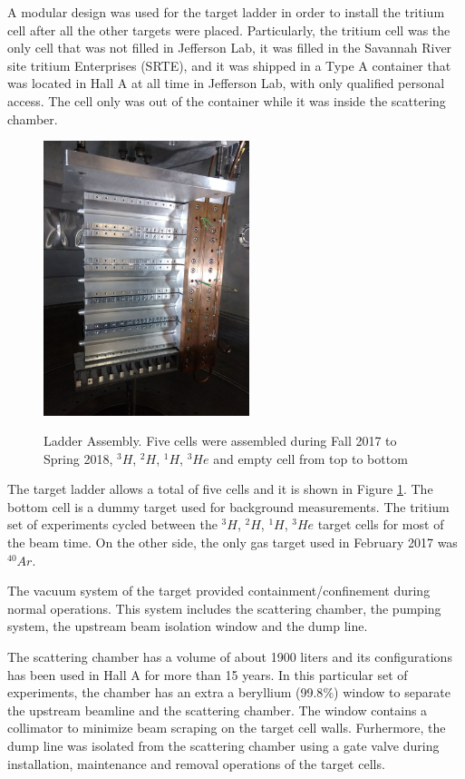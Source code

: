 \documentclass[final,5p,times,twocolumn]{elsarticle}
\begin{document}
A modular design was used for the target ladder in order to install the tritium cell after all the other targets were placed. 
Particularly, the tritium cell was the only cell that was not filled in Jefferson Lab, it was filled in the Savannah River 
site tritium Enterprises (SRTE), and it was shipped in a Type A container that was located in Hall A at all time in Jefferson Lab, 
with only qualified personal access. The cell only was out of the container while it was inside the scattering chamber. 

\begin{figure}[htbp]
\centering
  \includegraphics[width=6cm]{images/ladder.jpg}\\
  \caption{Ladder Assembly. Five cells were assembled during Fall 2017 to Spring 2018, $^{3}H$, $^{2}H$, $^{1}H $, $^{3}He$ and empty cell from top to bottom
 }\label{ladder}
\end{figure}

The target ladder allows a total of five cells and it is shown in Figure \ref{ladder}.  The bottom cell is a dummy target 
used for background measurements. The tritium set of experiments cycled between the $^{3}H$, $^{2}H$, $^{1}H $, $^{3}He$ target 
cells for most of the beam time. On the other side, the only gas target used in February 2017 was $^{40}Ar$.

The vacuum system of the target provided containment/confinement during normal operations. This system includes the scattering chamber, 
the pumping system, the upstream beam isolation window and the dump line.  

The scattering chamber has a volume of about 1900 liters and its configurations has been used in Hall A for more than 15 years. 
In this particular set of experiments, the chamber has an extra a beryllium (99.8$\%$) window to separate the upstream beamline 
and the scattering chamber. The window contains a collimator to minimize beam scraping on the target cell walls. Furhermore, 
the dump line was isolated from the scattering chamber using a gate valve during installation, maintenance and removal operations of the target cells. 
\end{document}
